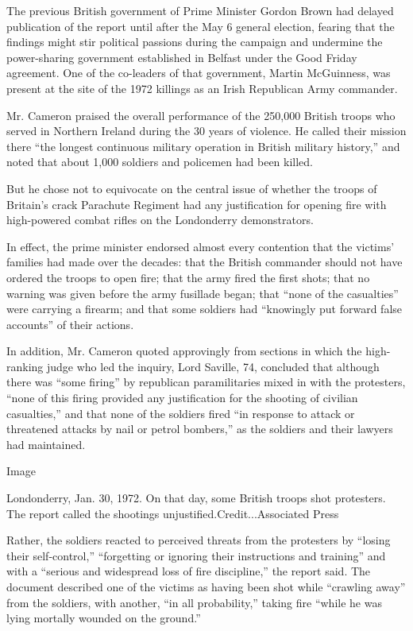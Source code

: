 The previous British government of Prime Minister Gordon Brown had
delayed publication of the report until after the May 6 general
election, fearing that the findings might stir political passions during
the campaign and undermine the power-sharing government established in
Belfast under the Good Friday agreement. One of the co-leaders of that
government, Martin McGuinness, was present at the site of the 1972
killings as an Irish Republican Army commander.

Mr. Cameron praised the overall performance of the 250,000 British
troops who served in Northern Ireland during the 30 years of violence.
He called their mission there ``the longest continuous military
operation in British military history,'' and noted that about 1,000
soldiers and policemen had been killed.

But he chose not to equivocate on the central issue of whether the
troops of Britain's crack Parachute Regiment had any justification for
opening fire with high-powered combat rifles on the Londonderry
demonstrators.

In effect, the prime minister endorsed almost every contention that the
victims' families had made over the decades: that the British commander
should not have ordered the troops to open fire; that the army fired the
first shots; that no warning was given before the army fusillade began;
that ``none of the casualties'' were carrying a firearm; and that some
soldiers had ``knowingly put forward false accounts'' of their actions.

In addition, Mr. Cameron quoted approvingly from sections in which the
high-ranking judge who led the inquiry, Lord Saville, 74, concluded that
although there was ``some firing'' by republican paramilitaries mixed in
with the protesters, ``none of this firing provided any justification
for the shooting of civilian casualties,'' and that none of the soldiers
fired ``in response to attack or threatened attacks by nail or petrol
bombers,'' as the soldiers and their lawyers had maintained.

Image

Londonderry, Jan. 30, 1972. On that day, some British troops shot
protesters. The report called the shootings
unjustified.Credit...Associated Press

Rather, the soldiers reacted to perceived threats from the protesters by
``losing their self-control,'' ``forgetting or ignoring their
instructions and training'' and with a ``serious and widespread loss of
fire discipline,'' the report said. The document described one of the
victims as having been shot while ``crawling away'' from the soldiers,
with another, ``in all probability,'' taking fire ``while he was lying
mortally wounded on the ground.''


